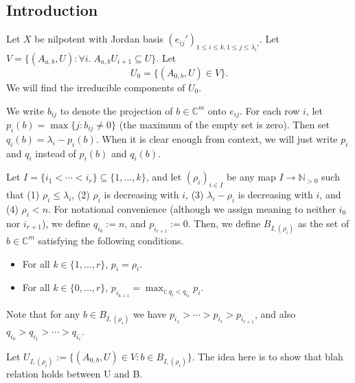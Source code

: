 \documentclass[12pt,psamsfonts]{article}
\begin{document}
\subsection{Introduction}
Let \(X\) be nilpotent with Jordan basis \((e_{ij}')_{1 \leq i \leq k, 1 \leq j \leq \lambda_i'}\).
Let \(V = \{(A_{a,b}, U) : \forall i. \; A_{a,b} U_{i + 1} \subseteq U\}\).
Let
\[U_0 = \{(A_{0,b}, U) \in V\}.\]
We will find the irreducible components of \(U_0\).
\par We write \(b_{ij}\) to denote the projection of \(b \in \mathbb{C}^m\) onto \(e_{ij}\).
For each row \(i\), let \(p_i(b) = \max\{j : b_{ij} \neq 0\}\) (the maximum of the empty set is zero).
Then set \(q_i(b) = \lambda_i - p_i(b)\).
When it is clear enough from context, we will just write \(p_i\) and \(q_i\) instead of \(p_i(b)\) and \(q_i(b)\).
\par Let \(I = \{i_1 < \cdots < i_r\} \subseteq \{1, ..., k\}\), and let \((\rho_i)_{i \in I}\) be any map \(I \to \mathbb{N}_{> 0}\) such that (1) \(\rho_i \leq \lambda_i\), (2) \(\rho_i\) is decreasing with \(i\), (3) \(\lambda_i - \rho_i\) is decreasing with \(i\), and (4) \(\rho_i < n\).
For notational convenience (although we assign meaning to neither \(i_0\) nor \(i_{r + 1}\)), we define \(q_{i_0} := n\), and \(p_{i_{r + 1}} := 0\).
Then, we define \(B_{I, (\rho_i)}\) as the set of \(b \in \mathbb{C}^m\) satisfying the following conditions.
\begin{itemize}
    \item For all \(k \in \{1, ..., r\}\), \(p_i = \rho_i\).
    \item For all \(k \in \{0, ..., r\}\), \(p_{i_{k + 1}} = \max_{i : q_i < q_{i_k}} p_i\).
\end{itemize}
Note that for any \(b \in B_{I, (\rho_i)}\) we have \(p_{i_1} > \cdots > p_{i_r} > p_{i_{r + 1}}\), and also \(q_{i_0} > q_{i_1} > \cdots > q_{i_r}\).
\par Let \(U_{I, (\rho_i)} := \{(A_{0, b}, U) \in V : b \in B_{I, (\rho_i)}\}\).
The idea here is to show that blah relation holds between U and B.
\end{document}
